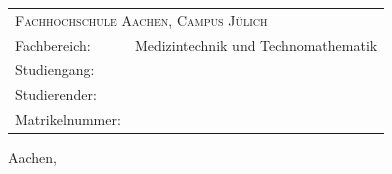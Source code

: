 %
\begin{titlepage}
	\begin{flushright}
		\textbf{\Large \documentTitle}
		\linebreak
		\linebreak
		\textbf{\Large \documentTypeName}
		\linebreak
		\linebreak
	\end{flushright}
	\vfill
	\begin{tabular*}{\linewidth}{ll}
	    \multicolumn{2}{l}{\textsc{Fachhochschule Aachen, Campus Jülich}}\\
		Fachbereich: & Medizintechnik und Technomathematik\\
		Studiengang: & \studiengang\\
		Studierender: & \authorOfWork\\ 
		Matrikelnummer: & \matrikelnummer
	\end{tabular*}
	\vfill	
	\centering\large Aachen, \dateOfSubmission %
\end{titlepage}